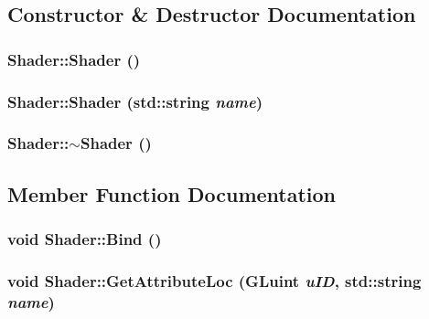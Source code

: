 \subsection{Constructor \& Destructor Documentation}
\hypertarget{class_shader_0d654ebaca4e0555197c0724c6d30610}{
\subsubsection[{Shader}]{\setlength{\rightskip}{0pt plus 5cm}Shader::Shader ()}}
\label{class_shader_0d654ebaca4e0555197c0724c6d30610}


\hypertarget{class_shader_518d41ef6354061360c42a250f1bbc09}{
\subsubsection[{Shader}]{\setlength{\rightskip}{0pt plus 5cm}Shader::Shader (std::string {\em name})}}
\label{class_shader_518d41ef6354061360c42a250f1bbc09}


\hypertarget{class_shader_ff01df87e8a102f270b5b135a295e59d}{
\subsubsection[{$\sim$Shader}]{\setlength{\rightskip}{0pt plus 5cm}Shader::$\sim$Shader ()}}
\label{class_shader_ff01df87e8a102f270b5b135a295e59d}




\subsection{Member Function Documentation}
\hypertarget{class_shader_8b5c8c4788d011a65d158ef8428d1ece}{
\subsubsection[{Bind}]{\setlength{\rightskip}{0pt plus 5cm}void Shader::Bind ()}}
\label{class_shader_8b5c8c4788d011a65d158ef8428d1ece}


\hypertarget{class_shader_90e9b005fad30ca71a1125bcb9bf74f5}{
\subsubsection[{GetAttributeLoc}]{\setlength{\rightskip}{0pt plus 5cm}void Shader::GetAttributeLoc (GLuint {\em uID}, \/  std::string {\em name})}}
\label{class_shader_90e9b005fad30ca71a1125bcb9bf74f5}


